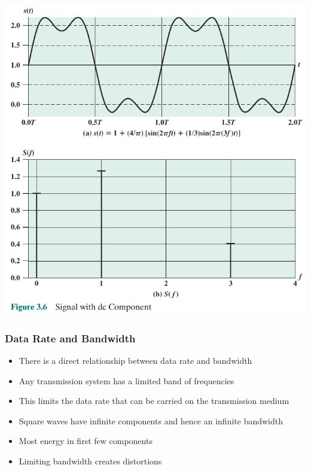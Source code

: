 \documentclass[pdflatex,compress]{beamer}
\begin{document}
\begin{frame}
	\begin{center}
		\includegraphics[height=0.9\textheight]{img/img06}
	\end{center}
\end{frame}

\begin{frame}
	\frametitle{Data Rate and Bandwidth}
	\begin{itemize}
		\item 	There is a direct relationship between data rate and bandwidth
		\item Any transmission system has a limited band of frequencies
		\item This limits the data rate that can be carried on the transmission medium
		\item Square waves have infinite components and hence an infinite bandwidth
		\item Most energy in first few components
		\item Limiting bandwidth creates distortions
	\end{itemize}
\end{frame}
\end{document}
